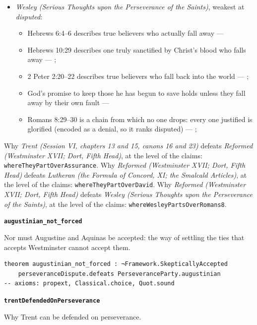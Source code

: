 \documentclass[11pt]{article}
\begin{document}
\begin{itemize}
\begin{itemize}
\end{itemize}
\item \emph{Wesley (Serious Thoughts upon the Perseverance of the Saints)}, weakest at \emph{disputed}:
\begin{itemize}
\item Hebrews 6:4–6 describes true believers who actually fall away --- \cite[449]{wesley-works-9-1827}
\item Hebrews 10:29 describes one truly sanctified by Christ’s blood who falls away --- \cite[448--449]{wesley-works-9-1827}; \cite[585]{wesley-explanatory-notes-nt}
\item 2 Peter 2:20–22 describes true believers who fall back into the world --- \cite[445--446]{wesley-works-9-1827}; \cite[625]{wesley-explanatory-notes-nt}
\item God’s promise to keep those he has begun to save holds unless they fall away by their own fault --- \cite[444--445]{wesley-works-9-1827}
\item Romans 8:29–30 is a chain from which no one drops: every one justified is glorified (encoded as a denial, so it ranks disputed) --- \cite[384]{wesley-explanatory-notes-nt}; \cite[413]{wesley-works-9-1827}
\end{itemize}
\end{itemize}
\noindent Why \emph{Trent (Session VI, chapters 13 and 15, canons 16 and 23)} defeats \emph{Reformed (Westminster XVII; Dort, Fifth Head)}, at the level of the claims: \texttt{where\allowbreak{}They\allowbreak{}Part\allowbreak{}Over\allowbreak{}Assurance}.
\noindent Why \emph{Reformed (Westminster XVII; Dort, Fifth Head)} defeats \emph{Lutheran (the Formula of Concord, XI; the Smalcald Articles)}, at the level of the claims: \texttt{where\allowbreak{}They\allowbreak{}Part\allowbreak{}Over\allowbreak{}David}.
\noindent Why \emph{Reformed (Westminster XVII; Dort, Fifth Head)} defeats \emph{Wesley (Serious Thoughts upon the Perseverance of the Saints)}, at the level of the claims: \texttt{where\allowbreak{}Wesley\allowbreak{}Parts\allowbreak{}Over\allowbreak{}Romans8}.
\par\medskip\noindent\textbf{\texttt{augustinian\_\allowbreak{}not\_\allowbreak{}forced}}\par\nobreak\noindent
Nor must Augustine and Aquinas be accepted: the way of settling the ties that accepts Westminster cannot accept them.

{\small\begin{verbatim}
theorem augustinian_not_forced : ¬Framework.SkepticallyAccepted
    perseveranceDispute.defeats PerseveranceParty.augustinian
-- axioms: propext, Classical.choice, Quot.sound
\end{verbatim}}
\par\medskip\noindent\textbf{\texttt{trent\allowbreak{}Defended\allowbreak{}On\allowbreak{}Perseverance}}\par\nobreak\noindent
Why Trent can be defended on perseverance.
\end{document}
